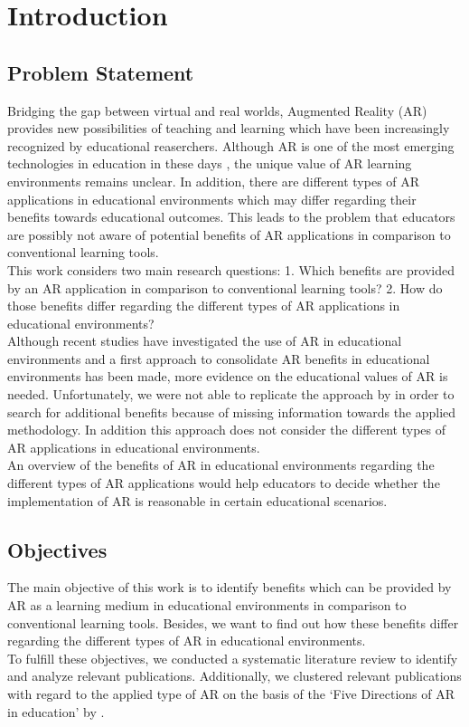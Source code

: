 \section{Introduction}
\label{sec:Introduction}
\subsection{Problem Statement}
\label{subsec:ProblemStatement}
Bridging the gap between virtual and real worlds, Augmented Reality (AR) provides new possibilities of teaching and learning which have been increasingly recognized by educational reaserchers. \autocite [cf.][41]{Wu.2013} Although AR is one of the most emerging technologies in education in these days \autocite [cf.][21]{Johnson.2010}, the unique value of AR learning environments remains unclear.\autocite[\label{fn:Wu_2013_48}cf.][48]{Wu.2013} In addition, there are different types of AR applications in educational environments which may differ regarding their benefits towards educational outcomes. \autocite [cf.][126-130]{Yuen.2011} This leads to the problem that educators are possibly not aware of potential benefits of AR applications in comparison to conventional learning tools. \\
This work considers two main research questions: 1. Which benefits are provided by an AR application in comparison to conventional learning tools? 2. How do those benefits differ regarding the different types of AR applications in educational environments? \\
Although recent studies have investigated the use of AR in educational environments \autocite {Wu.2013}\mulcit\autocite {Lee.2012} and a first approach to consolidate AR benefits in educational environments has been made, \autocite{Radu.2014} more evidence on the educational values of AR is needed. Unfortunately, we were not able to replicate the approach by \cite{Radu.2014} in order to search for additional benefits because of missing information towards the applied methodology. In addition this approach does not consider the different types of AR applications in educational environments.\\
An overview of the benefits of AR in educational environments regarding the different types of AR applications would help educators to decide whether the implementation of AR is reasonable in certain educational scenarios.\\
\subsection{Objectives}
\label{subsec:Objectives}
The main objective of this work is to identify benefits which can be provided by AR as a learning medium in educational environments in comparison to conventional learning tools. Besides, we want to find out how these benefits differ regarding the different types of AR in educational environments. \\
To fulfill these objectives, we conducted a systematic literature review to identify and analyze relevant publications. Additionally, we clustered relevant publications with regard to the applied type of AR on the basis of the ‘Five Directions of AR in education’ by \cite{Yuen.2011}.
